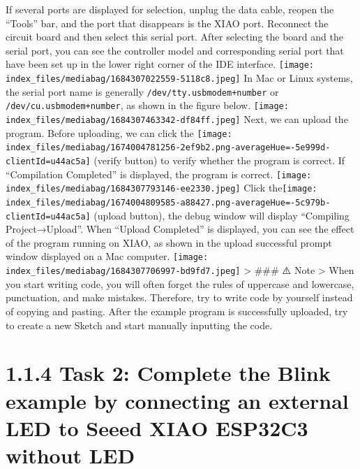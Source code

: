 \documentclass[
  letterpaper,
  DIV=11,
  numbers=noendperiod]{scrreprt}
\begin{document}
If several ports are displayed for selection, unplug the data cable,
reopen the ``Tools'' bar, and the port that disappears is the XIAO port.
Reconnect the circuit board and then select this serial port. After
selecting the board and the serial port, you can see the controller
model and corresponding serial port that have been set up in the lower
right corner of the IDE interface.
\texttt{[image: index\_files/mediabag/1684307022559-5118c8.jpeg]} In Mac
or Linux systems, the serial port name is generally
\texttt{/dev/tty.usbmodem+number} or \texttt{/dev/cu.usbmodem+number},
as shown in the figure below.
\texttt{[image: index\_files/mediabag/1684307463342-df84ff.jpeg]} Next,
we can upload the program. Before uploading, we can click the
\texttt{[image: index\_files/mediabag/1674004781256-2ef9b2.png-averageHue=-5e999d-clientId=u44ac5a]}
(verify button) to verify whether the program is correct. If
``Compilation Completed'' is displayed, the program is correct.
\texttt{[image: index\_files/mediabag/1684307793146-ee2330.jpeg]} Click
the\texttt{[image: index\_files/mediabag/1674004809585-a88427.png-averageHue=-5c979b-clientId=u44ac5a]}
(upload button), the debug window will display ``Compiling
Project→Upload''. When ``Upload Completed'' is displayed, you can see
the effect of the program running on XIAO, as shown in the upload
successful prompt window displayed on a Mac computer.
\texttt{[image: index\_files/mediabag/1684307706997-bd9fd7.jpeg]}
\textgreater{} \#\#\# ⚠️ Note \textgreater{} When you start writing
code, you will often forget the rules of uppercase and lowercase,
punctuation, and make mistakes. Therefore, try to write code by yourself
instead of copying and pasting. After the example program is
successfully uploaded, try to create a new Sketch and start manually
inputting the code.

\hypertarget{task-2-complete-the-blink-example-by-connecting-an-external-led-to-seeed-xiao-esp32c3-without-led}{%
\section*{1.1.4 Task 2: Complete the Blink example by connecting an
external LED to Seeed XIAO ESP32C3 without
LED}\label{task-2-complete-the-blink-example-by-connecting-an-external-led-to-seeed-xiao-esp32c3-without-led}}

\end{document}
